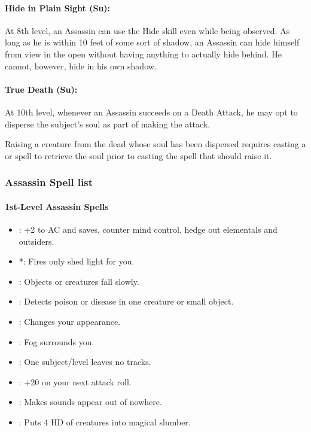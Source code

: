 \paragraph{Hide in Plain Sight (Su):}
At 8th level, an Assassin can use the Hide skill even while being observed. 
As long as he is within 10 feet of some sort of shadow, an Assassin can hide himself from view in the open without having anything to actually hide behind. 
He cannot, however, hide in his own shadow.

\paragraph{True Death (Su):}
At 10th level, whenever an Assassin succeeds on a Death Attack, he may opt to disperse the subject's soul as part of making the attack.

Raising a creature from the dead whose soul has been dispersed requires casting a  or  
spell to retrieve the soul prior to casting the spell that should raise it.

\subsubsection{Assassin Spell list}
\paragraph{1st-Level Assassin Spells}
\begin{itemize}
\item {}: +2 to AC and saves, counter mind control, hedge out elementals and outsiders.
\item {}*: Fires only shed light for you.
\item {}: Objects or creatures fall slowly.
\item {}: Detects poison or disease in one creature or small object.
\item {}: Changes your appearance.
\item {}: Fog surrounds you.
\item {}: One subject/level leaves no tracks.
\item {}: +20 on your next attack roll.
\item {}: Makes sounds appear out of nowhere.
\item {}: Puts 4 HD of creatures into magical slumber.
\end{itemize}

